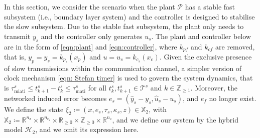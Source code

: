 

In this section, we consider the scenario when the plant $\mathcal{P}$ has a stable fast subsystem (i.e., boundary layer system) and the controller is designed to stabilise the slow subsystem. 
%
Due to the stable fast subsystem, the plant only needs to transmit  $y_s$ and the controller only generates $u_s$. The plant and controller below are in the form of \eqref{eqn:plant} and \eqref{eqn:controller}, where $k_{pf}$ and $k_{cf}$ are removed, that is, $y_p = y_s = k_{p_s}(x_p) $ and $u = u_s = k_{c_s}(x_c)$.
%
Given the exclusive presence of slow transmissions within the communication channel, a simpler version of clock mechanism \eqref{eqn: Stefan timer} is used to govern the system dynamics, that is $\tau_{\text{miati}}^s \leq t_{k+1}^s - t_k^s \leq \tau_{\text{mati}}^s$ for all $t_k^s, t_{k+1}^s\in \mathcal{T}^s$ and $k \in \mathbb{Z}_{\geq 1}$.
Moreover, the networked induced error becomes $e_s =  (\hat{y}_s - y_s, \hat{u}_s - u_s)$, and $e_f$ no longer exist. We define the state $\xi_2 \coloneqq (x,e_s, \tau_s, \kappa_s, z)\in \mathbb{X}_2$, with $\mathbb{X}_2\coloneqq \mathbb{R}^{n_x}\times \mathbb{R}^{n_{e_s}}\times  \mathbb{R}_{\geq 0} \times \mathbb{Z}_{\geq 0} \times \mathbb{R}^{n_z}$, and we define our system by the hybrid model $\mathcal{H}_2$, and we omit its expression here.

